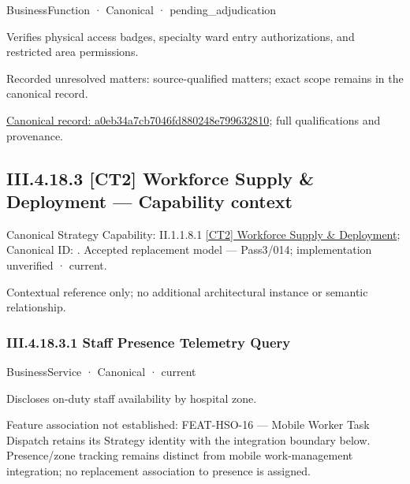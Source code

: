 \label{element:a0eb34a7cb7046fd880248e799632810}
{\small BusinessFunction · Canonical · pending\_adjudication}\par

Verifies physical access badges, specialty ward entry authorizations, and restricted area permissions.


{\small Recorded unresolved matters: source-qualified matters; exact scope remains in the canonical record.}\par
{\footnotesize \href{../../../../../../../../continuum/business/business-function/a0eb34a7cb7046fd880248e799632810.md}{Canonical record: a0eb34a7cb7046fd880248e799632810}; full qualifications and provenance.}\par
\subsection*{III.4.18.3 [CT2] Workforce Supply \& Deployment — Capability context}
\label{navigation:III.4.18.3}

{\small Canonical Strategy Capability: II.1.1.8.1 \hyperref[element:eacad022ee104fb3a6b21791a7abf19f]{[CT2] Workforce Supply \& Deployment}; Canonical ID: \texttt{}. Accepted replacement model — Pass3/014; implementation unverified · current.}\par
Contextual reference only; no additional architectural instance or semantic relationship.\par
\subsubsection*{III.4.18.3.1 Staff Presence Telemetry Query}
\label{navigation:III.4.18.3.1}

\label{element:b3cd0d8e40f44b9fa2b64367237345fa}
{\small BusinessService · Canonical · current}\par

Discloses on-duty staff availability by hospital zone.



Feature association not established: FEAT-HSO-16 — Mobile Worker Task Dispatch retains its Strategy identity with the integration boundary below. Presence/zone tracking remains distinct from mobile work-management integration; no replacement association to presence is assigned.


